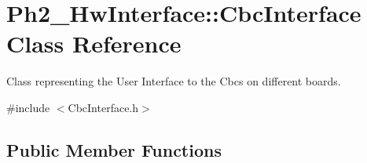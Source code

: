 \hypertarget{class_ph2___hw_interface_1_1_cbc_interface}{\section{Ph2\-\_\-\-Hw\-Interface\-:\-:Cbc\-Interface Class Reference}
\label{class_ph2___hw_interface_1_1_cbc_interface}
}


Class representing the User Interface to the Cbcs on different boards.  




{\ttfamily \#include $<$Cbc\-Interface.\-h$>$}

\subsection*{Public Member Functions}
